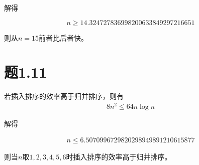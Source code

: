 \documentclass[a4paper,twoside]{article}
\begin{document}
\begin{spacing}{1.2}
解得

$$
n \ge 14.324727836998200633849297216651
$$

则从$n=15$前者比后者快。

\section{题1.11}
若插入排序的效率高于归并排序，则有
\begin{align*}
	8n^2 \le 64n \log n
\end{align*}

解得

\begin{align*}
	n \le 6.5070996729820298949891210615877
\end{align*}

则当$n$取$1,2,3,4,5,6$时插入排序的效率高于归并排序。

\end{spacing}
\end{document}
